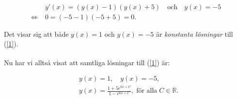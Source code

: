 \documentclass{article}
\begin{document}
\begin{align*}
  & y'(x) = (y(x) - 1)(y(x) + 5) \quad \text{och} \quad y(x) = -5 \\
  \iff\; & 0 = (-5 - 1)(-5 + 5) = 0\text{.}
\end{align*}

\noindent Det visar sig att både $y(x) = 1$ och $y(x) = -5$ är \emph{konstanta lösningar} till (\ref{1}).
\\
\\
\noindent Nu har vi alltså visat att samtliga lösningar till (\ref{1}) är:

\begin{align*}
  & y(x) = 1, \quad y(x) = -5, \\[4pt]
  & y(x) = \frac{1 + 5e^{6x + C}}{1 - e^{6x + C}}, \; \text{för alla}\; C \in \mathbb{R}\text{.}
\end{align*}
\end{document}
